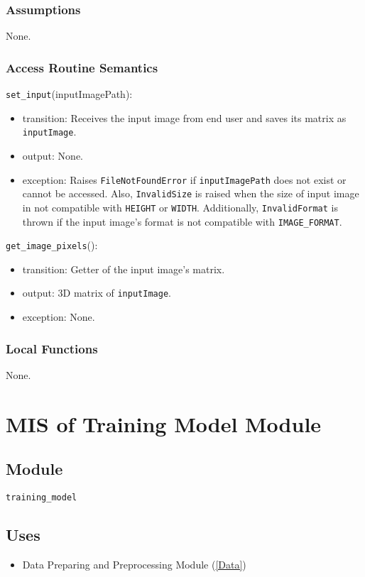 \documentclass[12pt, titlepage]{article}
\def\code#1{\texttt{#1}}
\begin{document}
\subsubsection{Assumptions}
None.

\subsubsection{Access Routine Semantics}

\noindent \code{set\_input}(inputImagePath):
\begin{itemize}
  \item transition: Receives the input image from end user and saves its matrix as \code{inputImage}.
  \item output: None.
  \item exception: Raises \code{FileNotFoundError} if \code{inputImagePath} does not exist or cannot be accessed. 
  Also, \code{InvalidSize} is raised when the size of input image in not compatible with \code{HEIGHT} or 
  \code{WIDTH}. Additionally, \code{InvalidFormat} is thrown if the input image's format is 
  not compatible with \code{IMAGE\_FORMAT}.
\end{itemize}

\noindent \code{get\_image\_pixels}():
\begin{itemize}
  \item transition: Getter of the input image's matrix.
  \item output: 3D matrix of \code{inputImage}.
  \item exception: None.
\end{itemize}


\subsubsection{Local Functions}
None.

\section{MIS of Training Model Module} \label{Train-Model} 

\subsection{Module}
\code{training\_model} 

\subsection{Uses}
\begin{itemize}
  \item Data Preparing and Preprocessing Module (\ref{Data})
\end{itemize}
\end{document}

